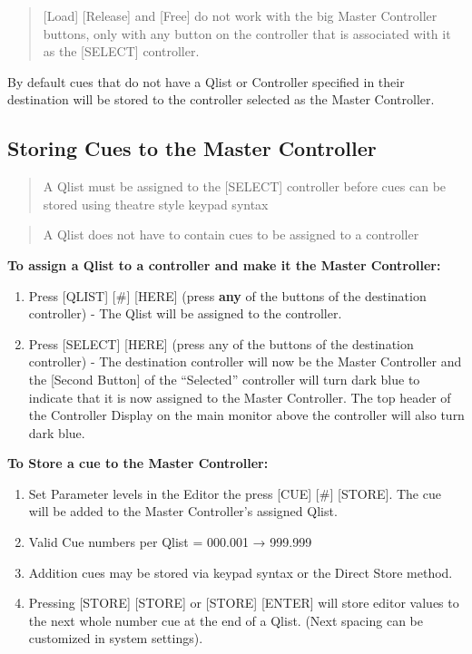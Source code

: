 \documentclass[
]{article}
\begin{document}
\begin{quote}
{[}Load{]} {[}Release{]} and {[}Free{]} do not work with the big Master Controller buttons, only with any button on the controller that is associated with it as the {[}SELECT{]} controller.
\end{quote}

By default cues that do not have a Qlist or Controller specified in their destination will be stored to the controller selected as the Master Controller.

\hypertarget{storing-cues-to-the-master-controller}{%
\subsection{Storing Cues to the Master Controller}\label{storing-cues-to-the-master-controller}}

\begin{quote}
A Qlist must be assigned to the {[}SELECT{]} controller before cues can be stored using theatre style keypad syntax
\end{quote}

\begin{quote}
A Qlist does not have to contain cues to be assigned to a controller
\end{quote}

\textbf{To assign a Qlist to a controller and make it the Master Controller:}

\begin{enumerate}
\def\labelenumi{\arabic{enumi}.}
\item
  Press {[}QLIST{]} {[}\#{]} {[}HERE{]} (press \textbf{any} of the buttons of the destination controller) - The Qlist will be assigned to the controller.
\item
  Press {[}SELECT{]} {[}HERE{]} (press any of the buttons of the destination controller) - The destination controller will now be the Master Controller and the {[}Second Button{]} of the ``Selected'' controller will turn dark blue to indicate that it is now assigned to the Master Controller. The top header of the Controller Display on the main monitor above the controller will also turn {dark blue}.
\end{enumerate}

\textbf{To Store a cue to the Master Controller:}

\begin{enumerate}
\def\labelenumi{\arabic{enumi}.}
\item
  Set Parameter levels in the Editor the press {[}CUE{]} {[}\#{]} {[}STORE{]}. The cue will be added to the Master Controller's assigned Qlist.
\item
  Valid Cue numbers per Qlist = 000.001 → 999.999
\item
  Addition cues may be stored via keypad syntax or the Direct Store method.
\item
  Pressing {[}STORE{]} {[}STORE{]} or {[}STORE{]} {[}ENTER{]} will store editor values to the next whole number cue at the end of a Qlist. (Next spacing can be customized in system settings).
\end{enumerate}
\end{document}
